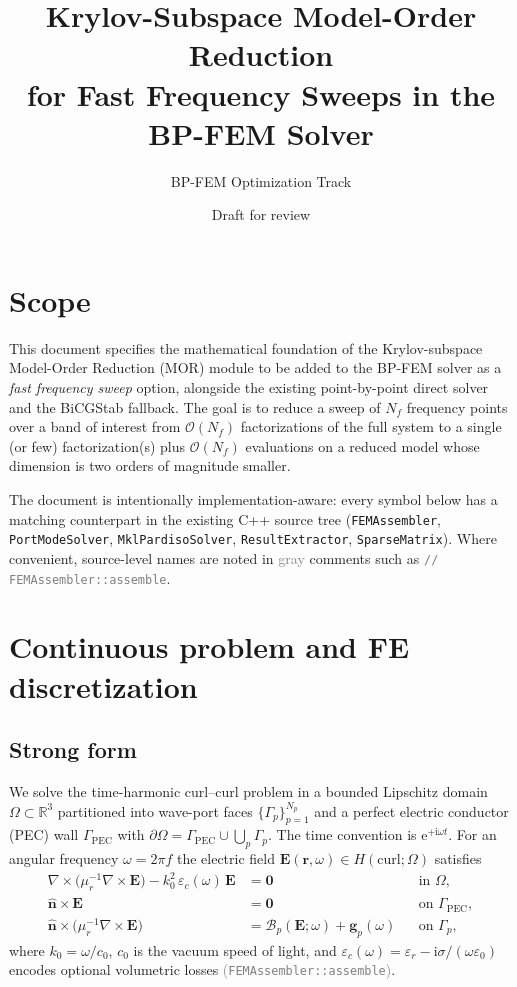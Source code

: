 \documentclass[11pt,a4paper]{article}
\title{Krylov-Subspace Model-Order Reduction \\ for Fast Frequency Sweeps in the BP-FEM Solver}
\author{BP-FEM Optimization Track}
\date{Draft for review}
\newcommand{\R}{\mathbb{R}}
\newcommand{\im}{\mathrm{i}}
\begin{document}
\maketitle
\tableofcontents
\bigskip

\section{Scope}

This document specifies the mathematical foundation of the Krylov-subspace
Model-Order Reduction (MOR) module to be added to the BP-FEM solver as a
\emph{fast frequency sweep} option, alongside the existing point-by-point
direct solver and the BiCGStab fallback. The goal is to reduce a sweep of
$N_f$ frequency points over a band of interest from $\mathcal{O}(N_f)$
factorizations of the full system to a single (or few) factorization(s)
plus $\mathcal{O}(N_f)$ evaluations on a reduced model whose dimension is
two orders of magnitude smaller.

The document is intentionally implementation-aware: every symbol below has
a matching counterpart in the existing C++ source tree
(\texttt{FEMAssembler}, \texttt{PortModeSolver},
\texttt{MklPardisoSolver}, \texttt{ResultExtractor}, \texttt{SparseMatrix}).
Where convenient, source-level names are noted in
\textcolor{gray}{gray} comments such as
\textcolor{gray}{\texttt{// FEMAssembler::assemble}}.

\section{Continuous problem and FE discretization}

\subsection{Strong form}

We solve the time-harmonic curl--curl problem in a bounded Lipschitz
domain $\Omega \subset \R^3$ partitioned into wave-port faces
$\{\Gamma_p\}_{p=1}^{N_p}$ and a perfect electric conductor (PEC) wall
$\Gamma_{\mathrm{PEC}}$ with $\partial\Omega = \Gamma_{\mathrm{PEC}}\cup
\bigcup_p \Gamma_p$. The time convention is $\mathrm{e}^{+\im\omega t}$.
For an angular frequency $\omega = 2\pi f$ the electric field
$\bm E(\bm r,\omega) \in H(\mathrm{curl};\Omega)$ satisfies
\begin{align}
  \nabla\times\!\big(\mu_r^{-1}\nabla\times\bm E\big)
  -k_0^2\,\varepsilon_c(\omega)\,\bm E
  &= \bm 0
  & &\text{in } \Omega,\label{eq:strong}\\
  \hat{\bm n}\times\bm E &= \bm 0
  & &\text{on } \Gamma_{\mathrm{PEC}},\\
  \hat{\bm n}\times\!\big(\mu_r^{-1}\nabla\times\bm E\big)
  &= \mathcal B_p(\bm E;\omega) + \bm g_p(\omega)
  & &\text{on } \Gamma_p,
\end{align}
where $k_0 = \omega/c_0$, $c_0$ is the vacuum speed of light, and
$\varepsilon_c(\omega) = \varepsilon_r - \im\sigma/(\omega\varepsilon_0)$
encodes optional volumetric losses
\textcolor{gray}{(\texttt{FEMAssembler::assemble})}.
\end{document}
